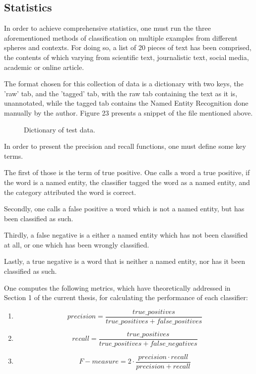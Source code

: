 \documentclass[12pt,a4paper]{article}
\begin{document}
\subsection{Statistics}

\qquad \quad In order to achieve comprehensive statistics, one must run the three aforementioned methods of classification on multiple examples from different spheres and contexts. For doing so, a list of 20 pieces of text has been comprised, the contents of which varying from scientific text, journalistic text, social media, academic or online article. 

\qquad The format chosen for this collection of data is a dictionary with two keys, the 'raw' tab, and the 'tagged' tab, with the raw tab containing the text as it is, unannotated, while the tagged tab contains the Named Entity Recognition done manually by the author. Figure 23 presents a snippet of the file mentioned above.

\begin{figure}[h!]
\begin{center}
\end{center}
\caption{Dictionary of test data.}
\end{figure}

\qquad In order to present the precision and recall functions, one must define some key terms.

\qquad The first of those is the term of true positive. One calls a word a true positive, if the word is a named entity, the classifier tagged the word as a named entity, and the category attributed the word is correct.

\qquad Secondly, one calls a false positive a word which is not a named entity, but has been classified as such.

\qquad Thirdly, a false negative is a either a named entity which has not been classified at all, or one which has been wrongly classified.

\qquad Lastly, a true negative is a word that is neither a named entity, nor has it been classified as such.

\qquad One computes the following metrics, which have theoretically addressed in Section 1 of the current thesis, for calculating the performance of each classifier:

\begin{enumerate}
\item \[precision = \frac{true\_positives}{true\_positives + false\_positives}\]
\item \[recall = \frac{true\_positives}{true\_positives + false\_negatives}\]
\item \[F-measure = 2 \cdot \frac{precision \cdot recall}{precision + recall}\]
\end{enumerate}
\end{document}
